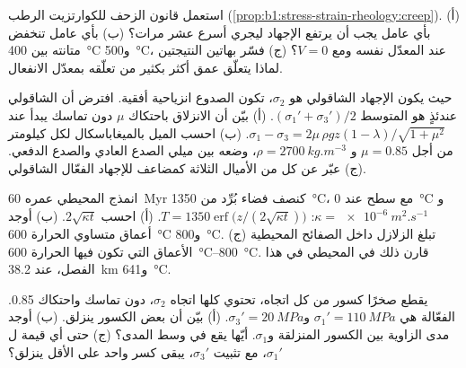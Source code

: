 \begin{exercise}[$\star\star$]\label{exo:b1:stress-strain-rheology:9}
استعمل قانون الزحف للكوارتزيت الرطب (\cref{prop:b1:stress-strain-rheology:creep}). (أ) بأي عامل يجب أن يرتفع الإجهاد ليجري أسرع عشر مرات؟ (ب) بأي عامل تنخفض متانته بين \qty{400}{\degreeCelsius} و\qty{500}{\degreeCelsius}، عند المعدّل نفسه ومع $V = 0$؟ (ج) فسّر بهاتين النتيجتين لماذا يتعلّق عمق   أكثر بكثير من تعلّقه بمعدّل الانفعال.
\end{exercise}

\begin{exercise}[$\star\star\star$]\label{exo:b1:stress-strain-rheology:10}
حيث يكون الإجهاد الشاقولي هو $\sigma_2$، تكون الصدوع انزياحية أفقية. افترض أن  الشاقولي عندئذٍ هو المتوسط $(\sigma_1' + \sigma_3')/2$. (أ) بيّن أن الانزلاق باحتكاك $\mu$ دون تماسك يبدأ عند
$\sigma_1 - \sigma_3 = 2\mu\,\rho g z(1-\lambda)/\sqrt{1+\mu^2}$. (ب) احسب الميل بالميغاباسكال لكل كيلومتر من أجل $\mu = 0.85$ و
$\rho = \qty{2700}{kg.m^{-3}}$، وضعه بين ميلي الصدع العادي والصدع الدفعي. (ج) عبّر عن كل من الأميال الثلاثة كمضاعف للإجهاد الفعّال الشاقولي.
\end{exercise}

\begin{exercise}[$\star\star\star$]\label{exo:b1:stress-strain-rheology:11}
انمذج  المحيطي عمره \qty{60}{Myr} كنصف فضاء بُرِّد من \qty{1350}{\degreeCelsius}، مع سطح عند \qty{0}{\degreeCelsius} و$\kappa = \qty{e-6}{m^2.s^{-1}}$: $T = \num{1350}\operatorname{erf}\bigl(z/(2\sqrt{\kappa t})\bigr)$. (أ) احسب $2\sqrt{\kappa t}$. (ب) أوجد أعماق متساوي الحرارة \qty{600}{\degreeCelsius} و\qty{800}{\degreeCelsius}. (ج) تبلغ الزلازل داخل الصفائح المحيطية الأعماق التي تكون فيها الحرارة \qtyrange{600}{800}{\degreeCelsius}. قارن ذلك  في  المحيطي في هذا الفصل، عند \qty{38.2}{km} و\qty{641}{\degreeCelsius}.
\end{exercise}

\begin{exercise}[$\star\star\star$]\label{exo:b1:stress-strain-rheology:12}
يقطع صخرًا كسور من كل اتجاه، تحتوي كلها اتجاه $\sigma_2$، دون تماسك واحتكاك 0.85.  الفعّالة هي $\sigma_1' = \qty{110}{MPa}$ و$\sigma_3' = \qty{20}{MPa}$. (أ) بيّن أن بعض الكسور ينزلق. (ب) أوجد مدى الزاوية بين الكسور المنزلقة و$\sigma_1$. أيّها يقع في وسط المدى؟ (ج) حتى أي قيمة ل$\sigma_1'$، مع تثبيت $\sigma_3'$، يبقى كسر واحد على الأقل ينزلق؟
\end{exercise}

